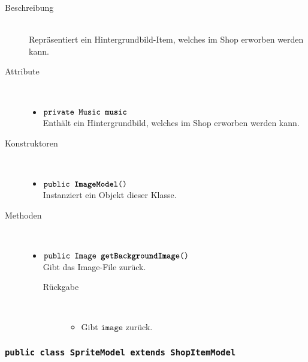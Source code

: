 \begin{description}
\item[Beschreibung] \hfill \\ Repräsentiert ein Hintergrundbild-Item, welches im Shop erworben werden kann.

\item[Attribute] \hfill \\
	\vspace{-.8cm}
	\begin{itemize}
		\item $\texttt{private Music \textbf{music}}$ \\ Enthält ein Hintergrundbild, welches im Shop erworben werden kann.

		\end{itemize}
	
\item[Konstruktoren] \hfill \\
	\vspace{-.8cm}
	\begin{itemize}
		\item $\texttt{public \textbf{ImageModel}()}$ \\ Instanziert ein Objekt dieser Klasse.

	\end{itemize}
	
\item[Methoden] \hfill \\
	\vspace{-.8cm}
	\begin{itemize}
		\item $\texttt{public Image \textbf{getBackgroundImage}()}$ \\ Gibt das Image-File zurück.
		\begin{description}
			\item[Rückgabe] \hfill \\
			\vspace{-.8cm}
			\begin{itemize}
				\item Gibt $\texttt{image}$ zurück.
			\end{itemize}
			\end{description}
		
	\end{itemize}
\end{description}


\subsubsection{\normalfont \texttt{public class \textbf{SpriteModel} extends ShopItemModel}}

